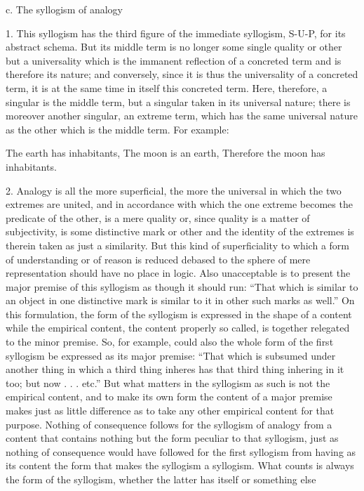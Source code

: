 c. The syllogism of analogy

1. This syllogism has the third figure
of the immediate syllogism, S-U-P,
for its abstract schema.
But its middle term is no longer
some single quality or other
but a universality
which is the immanent reflection of a concreted term
and is therefore its nature;
and conversely, since it is thus
the universality of a concreted term,
it is at the same time in itself this concreted term.
Here, therefore, a singular is the middle term,
but a singular taken in its universal nature;
there is moreover another singular, an extreme term,
which has the same universal nature as
the other which is the middle term.
For example:

The earth has inhabitants,
The moon is an earth,
Therefore the moon has inhabitants.

2. Analogy is all the more superficial,
the more the universal in which
the two extremes are united,
and in accordance with which the one extreme
becomes the predicate of the other,
is a mere quality or, since quality is
a matter of subjectivity,
is some distinctive mark or other
and the identity of the extremes is
therein taken as just a similarity.
But this kind of superficiality to which
a form of understanding or of reason is reduced
debased to the sphere of mere representation
should have no place in logic.
Also unacceptable is to present
the major premise of this syllogism
as though it should run:
“That which is similar to an object in one distinctive mark
is similar to it in other such marks as well.”
On this formulation, the form of the syllogism is
expressed in the shape of a content
while the empirical content,
the content properly so called,
is together relegated to the minor premise.
So, for example, could also the whole form of the first syllogism
be expressed as its major premise:
“That which is subsumed under another thing
in which a third thing inheres has
that third thing inhering in it too;
but now . . . etc.”
But what matters in the syllogism as such is
not the empirical content,
and to make its own form
the content of a major premise
makes just as little difference
as to take any other empirical content for that purpose.
Nothing of consequence follows for the syllogism of analogy
from a content that contains nothing
but the form peculiar to that syllogism,
just as nothing of consequence would have followed
for the first syllogism from having as its content
the form that makes the syllogism a syllogism.
What counts is always the form of the syllogism,
whether the latter has itself or something else
